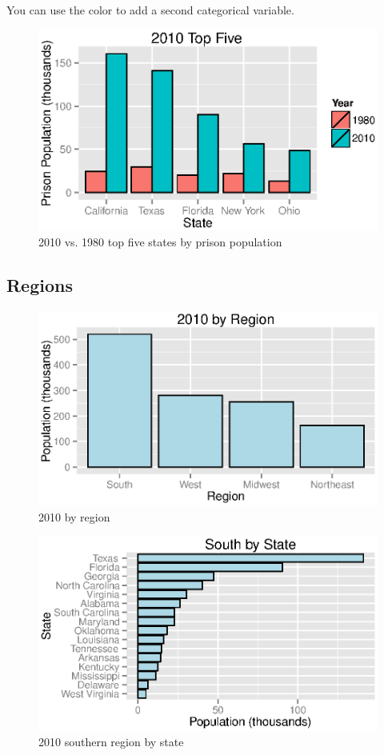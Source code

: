\documentclass{exam}
\begin{document}
  You can use the color to add a second categorical variable.
  \begin{figure}[H]
    \centering
    \includegraphics[scale = 0.9]{figures/1980_to_2010_top_five.eps}
    \caption{2010 vs. 1980 top five states by prison population}
  \end{figure}

  \subsection{Regions}
  \begin{figure}[H]
    \centering
    \includegraphics[scale = 0.9]{figures/regions_2010.eps}
    \caption{2010 by region}
  \end{figure}

  \begin{figure}[H]
    \centering
    \includegraphics[scale = 0.9]{figures/south_by_state.eps}
    \caption{2010 southern region by state}
  \end{figure}
\end{document}
